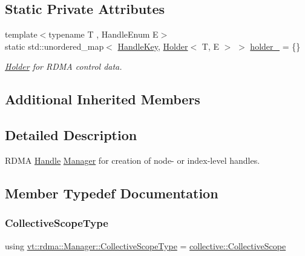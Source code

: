 \subsection*{Static Private Attributes}
\begin{DoxyCompactItemize}
\item 
{\footnotesize template$<$typename T , Handle\+Enum E$>$ }\\static std\+::unordered\+\_\+map$<$ \hyperlink{structvt_1_1rdma_1_1_handle_key}{Handle\+Key}, \hyperlink{structvt_1_1rdma_1_1_holder}{Holder}$<$ T, E $>$ $>$ \hyperlink{structvt_1_1rdma_1_1_manager_ab5b5ed6b205fba6f378ef22cdb3d4143}{holder\+\_\+} = \{\}
\begin{DoxyCompactList}\small\item\em \hyperlink{structvt_1_1rdma_1_1_holder}{Holder} for R\+D\+MA control data. \end{DoxyCompactList}\end{DoxyCompactItemize}
\subsection*{Additional Inherited Members}


\subsection{Detailed Description}
R\+D\+MA \hyperlink{structvt_1_1rdma_1_1_handle}{Handle} \hyperlink{structvt_1_1rdma_1_1_manager}{Manager} for creation of node-\/ or index-\/level handles. 

\subsection{Member Typedef Documentation}
\mbox{\label{structvt_1_1rdma_1_1_manager_a7a5509b81547110f71aa85027520cfd5}} 
\subsubsection{\texorpdfstring{Collective\+Scope\+Type}{CollectiveScopeType}}
{\footnotesize\ttfamily using \hyperlink{structvt_1_1rdma_1_1_manager_a7a5509b81547110f71aa85027520cfd5}{vt\+::rdma\+::\+Manager\+::\+Collective\+Scope\+Type} =  \hyperlink{structvt_1_1collective_1_1_collective_scope}{collective\+::\+Collective\+Scope}}

